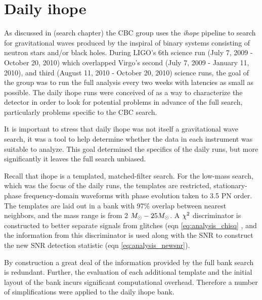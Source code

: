 

\section{Daily ihope}


As discussed in (search chapter) the CBC group uses the \emph{ihope}
pipeline to search for gravitational waves produced by the inspiral of
binary systems consisting of neutron stars and/or black holes.  During
LIGO's 6th science run (July 7, 2009 - October 20, 2010) which
overlapped Virgo's second (July 7, 2009 - January 11, 2010), and third
(August 11, 2010 - October 20, 2010) science runs, the goal of the
group was to run the full analysis every two weeks with latencies as
small as possible.  The daily ihope runs were conceived of as a way to
characterize the detector in order to look for potential problems in
advance of the full search, particularly problems specific to the CBC
search.

It is important to stress that daily ihope was not itself a
gravitational wave search, it was a tool to help determine whether the
data in each instrument was suitable to analyze.  This goal determined
the specifics of the daily runs, but more significantly it leaves the
full search unbiased.

Recall that ihope is a templated, matched-filter search.  For the
low-mass search, which was the focus of the daily runs, the templates
are restricted, stationary-phase frequency-domain waveforms with phase
evolution taken to 3.5 PN order.  The templates are laid out in a bank
with 97\% overlap between nearest neighbors, and the mass range is
from 2 $M_\odot - 25 M_\odot$.  A $\chi^2$ discriminator is constructed to
better separate signals from glitches (eqn \ref{eq:analysis_chisq} ,
and the information from this discriminator is used along with the SNR
to construct the new SNR detection statistic (eqn
\ref{eq:analysis_newsnr}).

By construction a great deal of the information provided by
the full bank search is redundant.  Further, the evaluation of each
additional template and the initial layout of the bank incurs
significant computational overhead.  Therefore a number of
simplifications were applied to the daily ihope bank.


